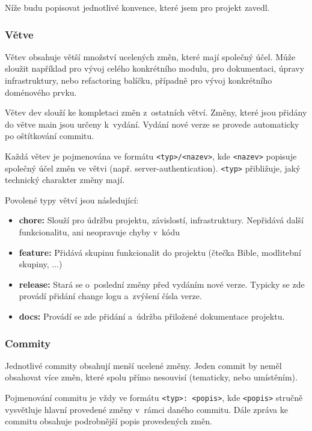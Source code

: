 \documentclass[
  tables=false,
  glossaries,
  index
]{kidiplom}
\begin{document}
Níže budu popisovat jednotlivé konvence, které jsem pro projekt zavedl.

\subsubsection{Větve}

Větev obsahuje větší množství ucelených změn, které mají společný účel. Může sloužit například pro vývoj celého konkrétního modulu, pro dokumentaci, úpravy infrastruktury, nebo refactoring balíčku, případně pro vývoj konkrétního doménového prvku.

Větev dev slouží ke kompletaci změn z~ostatních větví. Změny, které jsou přidány do větve main jsou určeny k~vydání. Vydání nové verze se provede automaticky po oštítkování commitu.

Každá větev je pojmenována ve formátu \texttt{<typ>/<nazev>}, kde \texttt{<nazev>} popisuje společný účel změn ve větvi (např. server-authentication). \texttt{<typ>} přibližuje, jaký technický charakter změny mají.

Povolené typy větví jsou následující:
\begin{itemize}
	\item \textbf{chore:} Slouží pro údržbu projektu, závislostí, infrastruktury. Nepřidává další funkcionalitu, ani neopravuje chyby v~kódu
	\item \textbf{feature:} Přidává skupinu funkcionalit do projektu (čtečka Bible, modlitební skupiny, ...)
	\item \textbf{release:} Stará se o~poslední změny před vydáním nové verze. Typicky se zde provádí přidání change logu a~zvýšení čísla verze.
	\item \textbf{docs:} Provádí se zde přidání a~údržba přiložené dokumentace projektu.
\end{itemize}


\subsubsection{Commity}

Jednotlivé commity obsahují menší ucelené změny. Jeden commit by neměl obsahovat více změn, které spolu přímo nesouvisí (tematicky, nebo umístěním).

Pojmenování commitu je vždy ve formátu \texttt{<typ>: <popis>}, kde \texttt{<popis>} stručně vysvětluje hlavní provedené změny v~rámci daného commitu. Dále zpráva ke commitu obsahuje podrobnější popis provedených změn.
\end{document}
